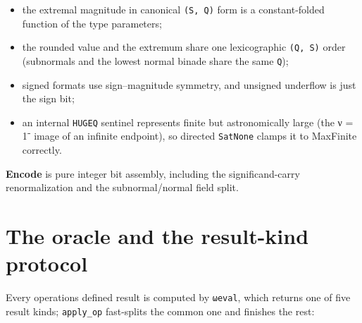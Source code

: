 \begin{itemize}
\item the extremal magnitude in canonical \texttt{(S, Q)} form is a constant-folded function of the type parameters;


\item the rounded value and the extremum share one lexicographic \texttt{(Q, S)} order (subnormals and the lowest normal binade share the same \texttt{Q});


\item signed formats use sign–magnitude symmetry, and unsigned underflow is just the sign bit;


\item an internal \texttt{HUGEQ} sentinel represents {\textquotedbl}finite but astronomically large{\textquotedbl} (the ν = 1⁻ image of an infinite endpoint), so directed \texttt{SatNone} clamps it to MaxFinite correctly.

\end{itemize}


\textbf{Encode} is pure integer bit assembly, including the significand-carry renormalization and the subnormal/normal field split.



\section{The oracle and the result-kind protocol}



\label{9066011901059263514}{}


Every operation{\textquotesingle}s defined result is computed by \texttt{ωeval}, which returns one of five result kinds; \texttt{apply\_op} fast-splits the common one and finishes the rest:




